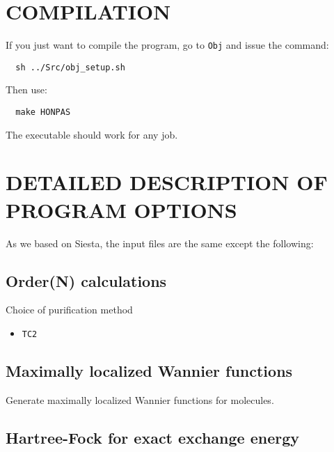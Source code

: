 \documentclass[11pt]{article}
\begin{document}
\section{COMPILATION}

If you just want to compile the program, go to {\tt Obj} and issue the command:

\begin{verbatim}
  sh ../Src/obj_setup.sh
\end{verbatim}

Then use:

\begin{verbatim}
  make HONPAS
\end{verbatim}

The executable should work for any job. 



\section{DETAILED DESCRIPTION OF PROGRAM OPTIONS}

As we based on {\sc Siesta}, the input files are the same except the following: 

\subsection{Order(N) calculations}
\begin{description}
\itemsep 10pt
\parsep 0pt
\item[{\bf ON purification }] 
Choice of purification method
\begin{itemize}
\item {\tt TC2}
\end{itemize}
\end{description}

\subsection{Maximally localized Wannier functions}
\begin{description}
\itemsep 10pt
\parsep 0pt
\item[{\bf MLWF }]
Generate maximally localized Wannier functions for molecules.
\end{description}



\vspace{5pt}
\subsection{Hartree-Fock for exact exchange energy}
\end{document}
